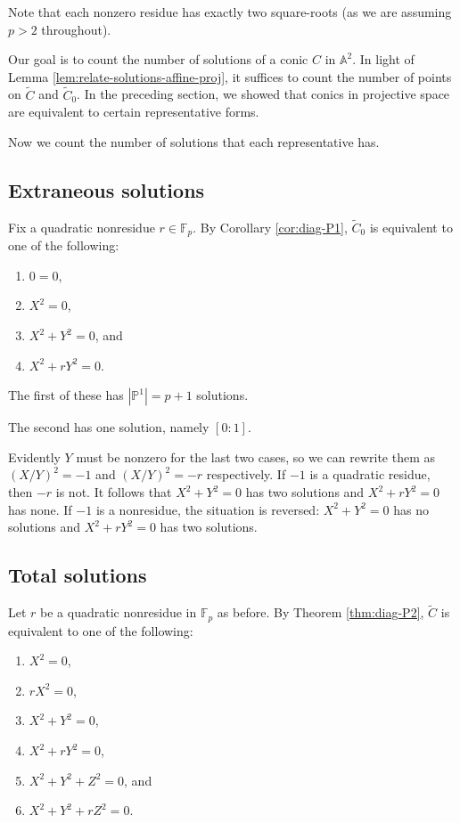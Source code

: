 \documentclass[10pt,a4paper]{amsart}
\numberwithin{equation}{section}
\numberwithin{figure}{section}
\theoremstyle{definition}
\theoremstyle{remark}
\theoremstyle{plain}
\theoremstyle{plain}
\theoremstyle{definition}
\theoremstyle{plain}
\theoremstyle{plain}
\newcommand{\A}{\mathbb{A}}
\renewcommand{\P}{\mathbb{P}}
\newcommand{\F}{\mathbb{F}}
\begin{document}
	Note that each nonzero residue has exactly two square-roots (as we are assuming
	$p > 2$ throughout).
	
	Our goal is to count the number of solutions of a conic $C$ in $\A^2$. In light of Lemma \ref{lem:relate-solutions-affine-proj}, it suffices to count the number of points on $\widetilde{C}$ and $\widetilde{C}_0$. In the preceding section, we showed that conics in projective space are equivalent to certain representative forms.
	
	Now we count the number of solutions that each representative has.
	
	\subsection{Extraneous solutions}
	\label{subsec:counting-P1-solutions}
	
	Fix a quadratic nonresidue $r \in \F_p$. By Corollary \ref{cor:diag-P1}, $\widetilde{C}_0$ is equivalent to one of the following:
	\begin{enumerate} 
		\item $0 = 0$, 
		\item $X^2 = 0$,
		\item $X^2 + Y^2 = 0$, and \label{case:x^2+y^2=0}
		\item $X^2 + rY^2 = 0$.  
	\end{enumerate}
	
	The first of these has $|\P^1| = p+1$ solutions. 
	
	The second has one solution, namely $[0:1]$.
	
	Evidently $Y$ must be nonzero for the last two cases, so we can rewrite them as
	$(X/Y)^2 = -1$ and $(X/Y)^2 = -r$ respectively. If $-1$ is a quadratic residue,
	then $-r$ is not. It follows that $X^2 + Y^2 = 0$ has two solutions and $X^2 +
	rY^2 = 0$ has none. If $-1$ is a nonresidue, the situation is reversed: $X^2 +
	Y^2 = 0$ has no solutions and $X^2 + rY^2 = 0$ has two solutions.
	
	\subsection{Total solutions}
	\label{subsec:counting-P2-solutions}
	
	Let $r$ be a quadratic nonresidue in $\F_p$ as before. By Theorem \ref{thm:diag-P2}, $\widetilde{C}$ is equivalent to one of the following:
	\begin{enumerate} 
		\item\label{case:rank1_x^2=0} $X^2 = 0$,
		\item\label{case:rank1_rx^2=0} $rX^2 = 0$,
		\item\label{case:rank2_x^2+y^2=0} $X^2 + Y^2 = 0$, 
		\item\label{case:rank2_x^2+ry^2=0} $X^2 + rY^2 = 0$,
		\item\label{case:rank3_x^2+y^2+z^2=0} $X^2 + Y^2 + Z^2 = 0$, and 
		\item\label{case:rank3_x^2+y^2+rz^2=0} $X^2 + Y^2 + rZ^2 = 0$.  
	\end{enumerate}
	
\end{document}
